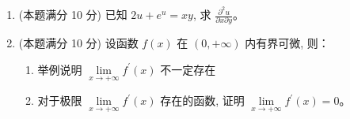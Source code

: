 \begin{enumerate}
{	\textbf{求级数和.}
	取 $x=0$：左端为 $1$，$\cos0=1$，故
	\[
	1=1-\frac{\pi^2}{3}+4\sum_{n=1}^{\infty}\frac{(-1)^{n+1}}{n^2}
	\ \Longrightarrow\
	\sum_{n=1}^{\infty}\frac{(-1)^{n+1}}{n^2}=\frac{\pi^2}{12}.
	\]

	\par\vspace{1mm}\noindent
	\textbf{注：}{\kaishu
	原答案把余弦级数写作 $1-\frac{\pi^2}{3}+4\sum\cos nx$，漏掉了系数
	$\frac{(-1)^{n+1}}{n^2}$，该级数处处发散，显然有误；正确系数为
	$a_n=\frac{4(-1)^{n+1}}{n^2}$（符号计算与数值求和均已证实，例如取 $x=2$
	时部分和收敛于 $1-2^2=-3$）。所求级数和 $\frac{\pi^2}{12}$ 则无误。
	}\par
}

\newpage
\item 	
(本题满分 10 分)	
已知 $2 u+e^{u}=x y$, 求 $\frac{\partial^{2} u}{\partial x \partial y}$。




\item 	
(本题满分 10 分)	
设函数 $f(x)$ 在 $(0,+\infty)$ 内有界可微, 则：
\begin{enumerate}
	\item
举例说明 $\lim\limits _{x \rightarrow+\infty} f^{\prime}(x)$ 不一定存在
\item 
对于极限 $\lim\limits _{x \rightarrow+\infty} f^{\prime}(x)$ 存在的函数, 证明 $\lim\limits _{x \rightarrow+\infty} f^{\prime}(x)=0$。
\end{enumerate}


\end{enumerate}
